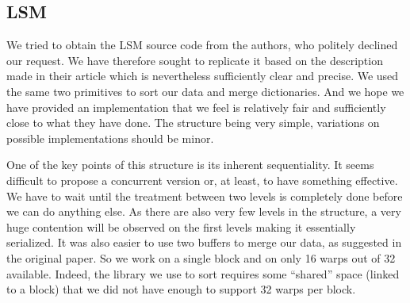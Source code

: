 \subsection{LSM}

We tried to obtain the LSM source code from the authors, who politely declined our request. We have therefore sought to replicate it based on the description made in their article which is nevertheless sufficiently clear and precise. We used the same two primitives to sort our data and merge dictionaries. And we hope we have provided an implementation that we feel is relatively fair and sufficiently close to what they have done. The structure being very simple, variations on possible implementations should be minor.

One of the key points of this structure is its inherent sequentiality. It seems difficult to propose a concurrent version or, at least, to have something effective. We have to wait until the treatment between two levels is completely done before we can do anything else. As there are also very few levels in the structure, a very huge contention will be observed on the first levels making it essentially serialized. It was also easier to use two buffers to merge our data, as suggested in the original paper. So we work on a single block and on only 16 warps out of 32 available. Indeed, the library we use to sort requires some ``shared'' space (linked to a block) that we did not have enough to support 32 warps per block.